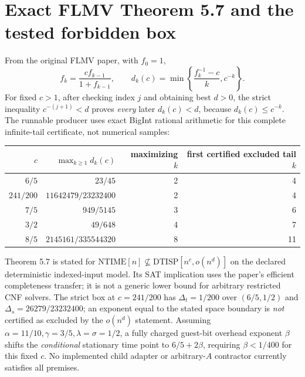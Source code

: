 \documentclass[11pt]{article}
\begin{document}
\section{Exact FLMV Theorem 5.7 and the tested forbidden box}
From the original FLMV paper, with $f_0=1$,
\[
 f_k=\frac{cf_{k-1}}{1+f_{k-1}},\qquad
 d_k(c)=\min\left\{\frac{f_k^{-1}-c}{k},c^{-k}\right\}.
\]
For fixed $c>1$, after checking index $j$ and obtaining best $d>0$, the strict inequality $c^{-(j+1)}<d$ proves \emph{every} later $d_k(c)<d$, because $d_k(c)\le c^{-k}$. The runnable producer uses exact BigInt rational arithmetic for this complete infinite-tail certificate, not numerical samples:
\begin{center}
\begin{tabular}{rrrr}
\toprule
$c$&$\max_{k\ge1}d_k(c)$& maximizing $k$& first certified excluded tail $k$\\\midrule
$6/5$&$23/45$&2&4\\
$241/200$&$11642479/23232400$&2&4\\
$7/5$&$949/5145$&3&6\\
$3/2$&$49/648$&4&7\\
$8/5$&$2145161/335544320$&8&11\\\bottomrule
\end{tabular}
\end{center}
Theorem 5.7 is stated for $\mathrm{NTIME}[n]\not\subseteq\mathrm{DTISP}[n^c,o(n^d)]$ on the declared deterministic indexed-input model. Its SAT implication uses the paper's efficient completeness transfer; it is not a generic lower bound for arbitrary restricted CNF solvers. The strict box at $c=241/200$ has $\Delta_t=1/200$ over $(6/5,1/2)$ and $\Delta_s=26279/23232400$; an exponent equal to the stated space boundary is \emph{not} certified as excluded by the $o(n^d)$ statement. Assuming $\alpha=11/10,\gamma=3/5,\lambda=\sigma=1/2$, a fully charged guest-bit overhead exponent $\beta$ shifts the \emph{conditional} stationary time point to $6/5+2\beta$, requiring $\beta<1/400$ for this fixed $c$. No implemented child adapter or arbitrary-$A$ contractor currently satisfies all premises.
\end{document}
